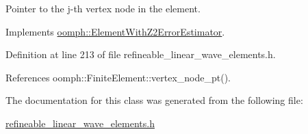 Pointer to the j-\/th vertex node in the element. 



Implements \hyperlink{classoomph_1_1ElementWithZ2ErrorEstimator_a0eedccc33519f852c5dc2055ddf2774b}{oomph\+::\+Element\+With\+Z2\+Error\+Estimator}.



Definition at line 213 of file refineable\+\_\+linear\+\_\+wave\+\_\+elements.\+h.



References oomph\+::\+Finite\+Element\+::vertex\+\_\+node\+\_\+pt().



The documentation for this class was generated from the following file\+:\begin{DoxyCompactItemize}
\item 
\hyperlink{refineable__linear__wave__elements_8h}{refineable\+\_\+linear\+\_\+wave\+\_\+elements.\+h}\end{DoxyCompactItemize}
